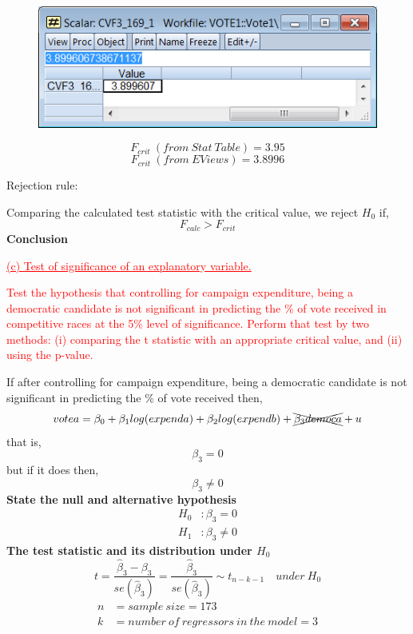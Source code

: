 \documentclass[12pt]{report}
\begin{document}
\vspace{-\baselineskip}
\begin{figure}[H]
	\centering
	\includegraphics{q1_8}
\end{figure}
\vspace{-\baselineskip}
$$F_{crit}\ (from\ Stat\ Table) = 3.95$$
$$F_{crit}\ (from\ EViews) = 3.8996$$

\noindent Rejection rule: 

\noindent Comparing the calculated test statistic with the critical value, we reject $H_0$ if,
$$F_{calc} > F_{crit}$$
\noindent \textbf{Conclusion}



\newpage
\noindent \textcolor{red}
{
	\uline{(c) Test of significance of an explanatory variable.}
}

\noindent \textcolor{red}
{
	Test the hypothesis that controlling for campaign expenditure, being a democratic candidate is not significant in predicting the \% of vote received in competitive races at the 5\% level of significance. Perform that test by two methods: 
	(i) comparing the t statistic with an appropriate critical value, and 
	(ii) using the p-value.
}

\noindent If after controlling for campaign expenditure, being a democratic candidate is not significant in predicting the \% of vote received then,
$$votea = \beta_0 + \beta_1log(expenda) + \beta_2log(expendb) + \xcancel{\beta_3democa} + u $$
\noindent that is,
$$\beta_3 = 0$$
\noindent but if it does then,
$$\beta_3 \neq 0$$
\noindent \textbf{State the null and alternative hypothesis}
\begin{align*}
H_0&: \beta_3 = 0 \\
H_1&: \beta_3 \neq 0
\end{align*}
\noindent \textbf{The test statistic and its distribution under $H_0$}
$$t = \dfrac{\hat{\beta}_3 - \beta_3}{se(\hat{\beta}_3)} = \dfrac{\hat{\beta}_3}{se(\hat{\beta}_3)} \sim t_{n-k-1} \quad under\ H_0$$
\begin{align*}
n &= sample\ size = 173 \\
k &= number\ of\ regressors\ in\ the\ model = 3
\end{align*}
\end{document}
